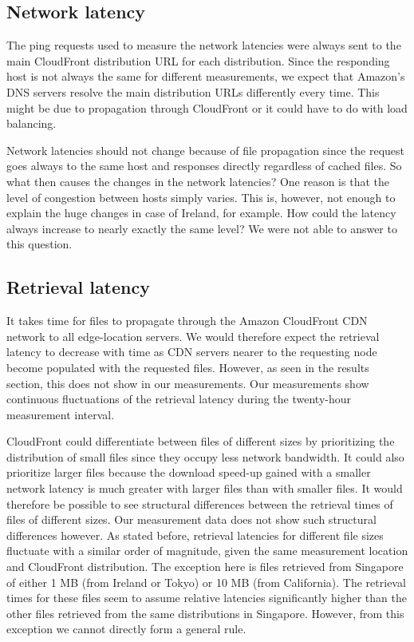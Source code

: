 \documentclass[conference]{IEEEtran}
\begin{document}
\subsection{Network latency}
The ping requests used to measure the network latencies were always sent to the main CloudFront distribution URL for each distribution. Since the responding host is not always the same for different measurements, we expect that Amazon's DNS servers resolve the main distribution URLs differently every time. This might be due to propagation through CloudFront or it could have to do with load balancing. 

Network latencies should not change because of file propagation since the request goes always to the same host and responses directly regardless of cached files. So what then causes the changes in the network latencies? One reason is that the level of congestion between hosts simply varies. This is, however, not enough to explain the huge changes in case of Ireland, for example. How could the latency always increase to nearly exactly the same level? We were not able to answer to this question.

\subsection{Retrieval latency}
It takes time for files to propagate through the Amazon CloudFront CDN network to all edge-location servers. We would therefore expect the retrieval latency to decrease with time as CDN servers nearer to the requesting node become populated with the requested files. However, as seen in the results section, this does not show in our measurements. Our measurements show continuous fluctuations of the retrieval latency during the twenty-hour measurement interval.

CloudFront could differentiate between files of different sizes by prioritizing the distribution of small files since they occupy less network bandwidth. It could also prioritize larger files because the download speed-up gained with a smaller network latency is much greater with larger files than with smaller files. It would therefore be possible to see structural differences between the retrieval times of files of different sizes. Our measurement data does not show such structural differences however. As stated before, retrieval latencies for different file sizes fluctuate with a similar order of magnitude, given the same measurement location and CloudFront distribution. The exception here is files retrieved from Singapore of either 1 MB (from Ireland or Tokyo) or 10 MB (from California). The retrieval times for these files seem to assume relative latencies significantly higher than the other files retrieved from the same distributions in Singapore. However, from this exception we cannot directly form a general rule.
\end{document}
